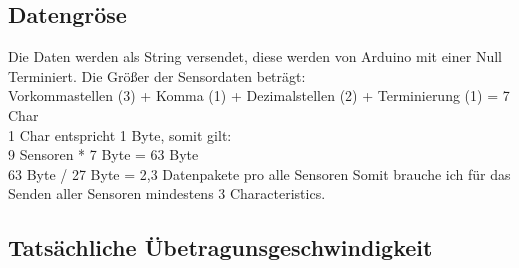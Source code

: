 \subsection{Datengröse}
Die Daten werden als String versendet, diese werden von Arduino mit einer
Null Terminiert. Die Größer der Sensordaten beträgt:\\
Vorkommastellen (3) + Komma (1) + Dezimalstellen (2) + Terminierung (1) = 7 Char
\\
1 Char entspricht 1 Byte, somit gilt:\\
9 Sensoren * 7 Byte = 63 Byte\\
63 Byte / 27 Byte = 2,3 Datenpakete pro alle Sensoren
Somit brauche ich für das Senden aller Sensoren mindestens 3 Characteristics.

\subsection{Tatsächliche Übetragunsgeschwindigkeit}
